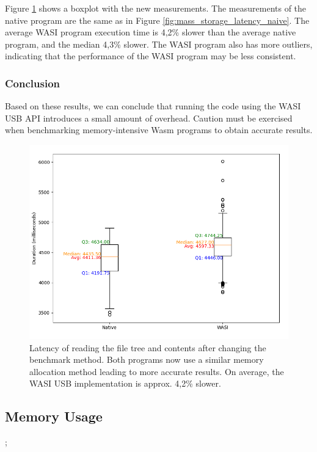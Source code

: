 Figure \ref{fig:mass_storage_latency_optimized} shows a boxplot with the new measurements. The measurements of the native program are the same as in Figure \ref{fig:mass_storage_latency_naive}. The average \acrshort{WASI} program execution time is 4,2\% slower than the average native program, and the median 4,3\% slower. The \acrshort{WASI} program also has more outliers, indicating that the performance of the \acrshort{WASI} program may be less consistent.

\subsubsection{Conclusion}
Based on these results, we can conclude that running the code using the \acrshort{WASI} \acrshort{USB} \acrshort{API} introduces a small amount of overhead. Caution must be exercised when benchmarking memory-intensive \acrshort{Wasm} programs to obtain accurate results.

\begin{figure}[H]
  \centering
  \includegraphics[width=1\textwidth]{images/mass_storage_1000_runs_optimized.png}
  \caption{Latency of reading the file tree and contents after changing the benchmark method. Both programs now use a similar memory allocation method leading to more accurate results. On average, the \acrshort{WASI} \acrshort{USB} implementation is approx. 4,2\% slower.}
  \label{fig:mass_storage_latency_optimized}
\end{figure}

\subsection{Memory Usage}
 
 
 ;